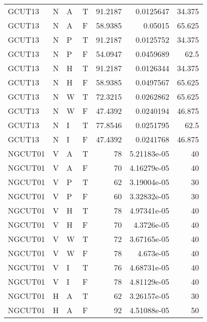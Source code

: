 \begin{longtable}{llllrrr}
    GCUT13   & N     & A     & T          & 91.2187    & 0.0125647   & 34.375   \\
    GCUT13   & N     & A     & F          & 58.9385    & 0.05015     & 65.625   \\
    GCUT13   & N     & P     & T          & 91.2187    & 0.0125752   & 34.375   \\
    GCUT13   & N     & P     & F          & 54.0947    & 0.0459689   & 62.5     \\
    GCUT13   & N     & H     & T          & 91.2187    & 0.0126344   & 34.375   \\
    GCUT13   & N     & H     & F          & 58.9385    & 0.0497567   & 65.625   \\
    GCUT13   & N     & W     & T          & 72.3215    & 0.0262862   & 65.625   \\
    GCUT13   & N     & W     & F          & 47.4392    & 0.0240194   & 46.875   \\
    GCUT13   & N     & I     & T          & 77.8546    & 0.0251795   & 62.5     \\
    GCUT13   & N     & I     & F          & 47.4392    & 0.0241768   & 46.875   \\
    NGCUT01  & V     & A     & T          & 78         & 5.21183e-05 & 40       \\
    NGCUT01  & V     & A     & F          & 70         & 4.16279e-05 & 40       \\
    NGCUT01  & V     & P     & T          & 62         & 3.19004e-05 & 30       \\
    NGCUT01  & V     & P     & F          & 60         & 3.32832e-05 & 30       \\
    NGCUT01  & V     & H     & T          & 78         & 4.97341e-05 & 40       \\
    NGCUT01  & V     & H     & F          & 70         & 4.3726e-05  & 40       \\
    NGCUT01  & V     & W     & T          & 72         & 3.67165e-05 & 40       \\
    NGCUT01  & V     & W     & F          & 78         & 4.673e-05   & 40       \\
    NGCUT01  & V     & I     & T          & 76         & 4.68731e-05 & 40       \\
    NGCUT01  & V     & I     & F          & 78         & 4.81129e-05 & 40       \\
    NGCUT01  & H     & A     & T          & 62         & 3.26157e-05 & 30       \\
    NGCUT01  & H     & A     & F          & 92         & 4.51088e-05 & 50       \\

\end{longtable}
